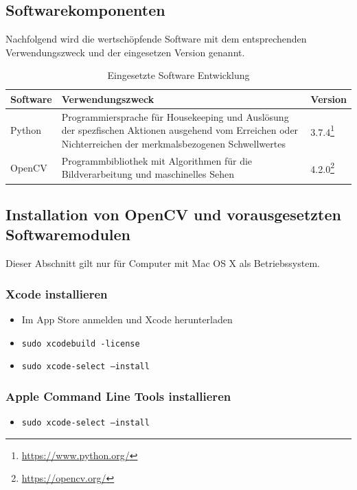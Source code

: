 \subsection{Softwarekomponenten}
Nachfolgend wird die wertschöpfende Software mit dem entsprechenden Verwendungszweck und der eingesetzen Version genannt.
\begin{table}[H]
	
	\begin{tabular}{p{3cm} p{8cm} p{3cm} }
		
		\toprule[1pt]
		\rowcolor{maroon!30}
		
		Software & Verwendungszweck & Version\\
		
		\midrule 
		Python  & Programmiersprache für Housekeeping und Auslösung der spezfischen Aktionen ausgehend vom Erreichen oder Nichterreichen der merkmalsbezogenen Schwellwertes & 3.7.4\footnote{\url{https://www.python.org/}}\\
		OpenCV &  Programmbibliothek mit Algorithmen für die Bildverarbeitung und maschinelles Sehen & 4.2.0\footnote{\url{https://opencv.org/}} \\ 		

		\bottomrule
	\end{tabular}
	\caption{Eingesetzte Software Entwicklung}
	\label{fig: Eingesetzte Software Entwicklung}
\end{table}

\subsection{Installation von OpenCV und vorausgesetzten Softwaremodulen}
Dieser Abschnitt gilt nur für Computer mit Mac OS X als Betriebssystem.
\subsubsection{Xcode installieren} 
\begin{itemize}
	\item Im App Store anmelden und Xcode herunterladen
	\item \texttt{sudo xcodebuild -license}
	\item \texttt{sudo xcode-select --install}
\end{itemize}

\subsubsection{Apple Command Line Tools installieren} 
\begin{itemize}
	\item \texttt{sudo xcode-select --install}
\end{itemize}

